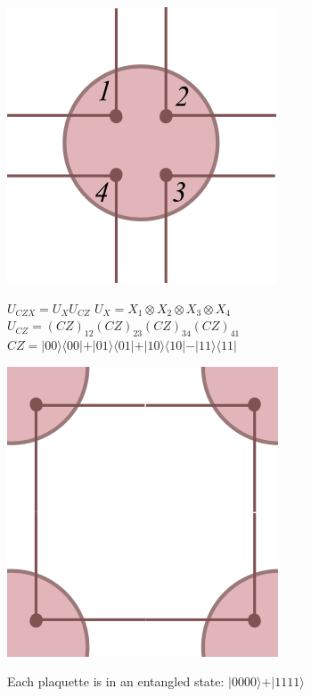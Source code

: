 \documentclass[a0,portrait]{a0poster}
\newcommand{\bra}[1]{\langle #1 \vert}
\newcommand{\ket}[1]{\vert #1 \rangle}
\begin{document}
\begin{multicols}{3}
\begin{minipage}[m]{0.3\linewidth}
	\includegraphics[width=0.6\linewidth]{czx_vertex_labelled}
\end{minipage}
\begin{minipage}[m]{0.65\linewidth}
	$ U_{CZX} = U_X U_{CZ} $ \newline
	$ U_X = X_1 \otimes X_2 \otimes X_3 \otimes X_4 $ \newline
	$ U_{CZ} = (CZ)_{12} (CZ)_{23} (CZ)_{34} (CZ)_{41} $ \newline
	$ CZ = \ket{00}\bra{00} + \ket{01}\bra{01} + \ket{10}\bra{10} - \ket{11}\bra{11} $
\end{minipage}

\vspace*{1cm}

\begin{minipage}[m]{0.3\linewidth}
	\includegraphics[width=0.4\linewidth]{czx_plaquette}
\end{minipage}
\begin{minipage}[m]{0.65\linewidth}
	Each plaquette is in an entangled state: $ \ket{0000} + \ket{1111}$
\end{minipage}

\vspace*{1cm}


\end{multicols}
\end{document}
